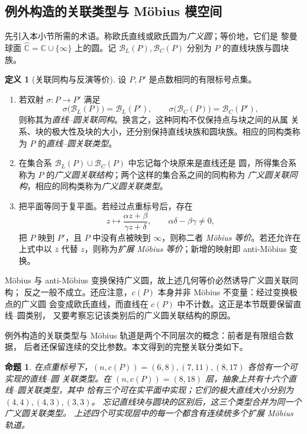 \documentclass[11pt,a4paper]{ctexart}
\newtheorem{proposition}[theorem]{命题}
\theoremstyle{definition}
\newtheorem{definition}[theorem]{定义}
\begin{document}
\subsection{例外构造的关联类型与 Möbius 模空间}
\label{sec:exceptional-moduli}

先引入本小节所需的术语。称欧氏直线或欧氏圆为\emph{广义圆}；等价地，它们是
黎曼球面 $\widehat{\mathbb C}=\mathbb C\cup\{\infty\}$ 上的圆。记
$\mathcal B_L(P),\mathcal B_C(P)$ 分别为 $P$ 的直线块族与圆块族。

\begin{definition}[关联同构与反演等价]
设 $P,P'$ 是点数相同的有限标号点集。
\begin{enumerate}[label=\textup{(\roman*)}]
\item 若双射 $\sigma:P\to P'$ 满足
\[
 \sigma\bigl(\mathcal B_L(P)\bigr)=\mathcal B_L(P'),\qquad
 \sigma\bigl(\mathcal B_C(P)\bigr)=\mathcal B_C(P'),
\]
则称其为\emph{直线--圆关联同构}。换言之，这种同构不仅保持点与块之间的从属
关系、块的极大性及块的大小，还分别保持直线块族和圆块族。相应的同构类称为
$P$ 的\emph{直线--圆关联类型}。
\item 在集合系 $\mathcal B_L(P)\cup\mathcal B_C(P)$ 中忘记每个块原来是直线还是
圆，所得集合系称为 $P$ 的\emph{广义圆关联结构}；两个这样的集合系之间的同构称为
\emph{广义圆关联同构}，相应的同构类称为\emph{广义圆关联类型}。
\item 把平面等同于复平面。若经过点重标号后，存在
\[
 z\longmapsto\frac{\alpha z+\beta}{\gamma z+\delta},\qquad
 \alpha\delta-\beta\gamma\ne0,
\]
把 $P$ 映到 $P'$，且 $P$ 中没有点被映到 $\infty$，则称二者 \emph{Möbius
等价}。若还允许在上式中以 $\overline z$ 代替 $z$，则称为\emph{扩展 Möbius
等价}；新增的映射即 anti-Möbius 变换。
\end{enumerate}
\end{definition}

Möbius 与 anti-Möbius 变换保持广义圆，故上述几何等价必然诱导广义圆关联同构；
反之一般不成立。还应注意，$c(P)$ 本身并非 Möbius 不变量：经过变换极点的广义圆
会变成欧氏直线，而直线在 $c(P)$ 中不计数。这正是本节既要保留直线--圆类别，
又要考察忘记该类别后的广义圆关联结构的原因。

例外构造的关联类型与 Möbius 轨道是两个不同层次的概念：前者是有限组合数据，
后者还保留连续的交比参数。本文得到的完整关联分类如下。

\begin{proposition}\label{prop:exceptional-types}
在点重标号下，$(n,c(P))=(6,8),(7,11),(8,17)$ 各恰有一个可实现的直线--圆
关联类型。在 $(n,c(P))=(8,18)$ 层，抽象上共有十六个直线--圆关联类型，其中
恰有三个可在实平面中实现；它们的极大直线大小分别为 $(4,4),(4,3),(3,3)$。
忘记直线块与圆块的区别后，这三个类型合并为同一个广义圆关联类型。
上述四个可实现层中的每一个都含有连续统多个扩展 Möbius 轨道。
\end{proposition}
\end{document}
